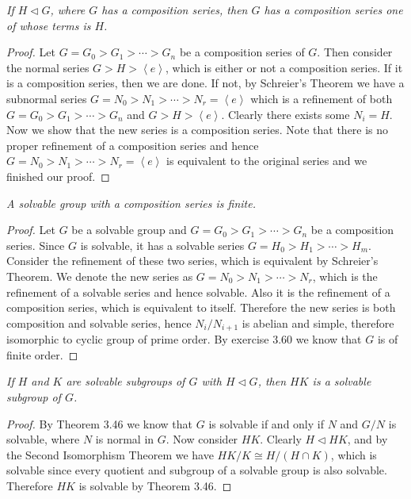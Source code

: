 \begin{problem}\em
If $H\lhd G$, where $G$ has a composition series, then $G$ has a composition series one of whose terms is $H$.
\end{problem}
\begin{proof}
Let $G=G_0>G_1>\cdots >G_n$ be a composition series of $G$. Then consider the normal series $G>H>\left< e \right> $, which is either or not a composition series. If it is a composition series, then we are done. If not, by Schreier's Theorem we have a subnormal series $G=N_0>N_1>\cdots >N_r=\left< e \right> $ which is a refinement of both $G=G_0>G_1>\cdots >G_n$ and $G>H>\left< e \right> $. Clearly there exists some $N_i=H$. Now we show that the new series is a composition series. Note that there is no proper refinement of a composition series and hence $G=N_0>N_1>\cdots >N_r=\left< e \right> $ is equivalent to the original series and we finished our proof.
\end{proof}
\begin{problem}\em
A solvable group with a composition series is finite.
\end{problem}
\begin{proof}
Let $G$ be a solvable group and $G=G_0>G_1>\cdots >G_n$ be a composition series. Since $G$ is solvable, it has a solvable series $G=H_0>H_1>\cdots >H_m$. Consider the refinement of these two series, which is equivalent by Schreier's Theorem. We denote the new series as $G=N_0>N_1>\cdots >N_r$, which is the refinement of a solvable series and hence solvable. Also it is the refinement of a composition series, which is equivalent to itself. Therefore the new series is both composition and solvable series, hence $N_i/N_{i+1}$ is abelian and simple, therefore isomorphic to cyclic group of prime order. By exercise 3.60 we know that $G$ is of finite order.
\end{proof}
\begin{problem}\em
If $H$ and $K$ are solvable subgroups of $G$ with $H\lhd G$, then $HK$ is a solvable subgroup of $G$.
\end{problem}
\begin{proof}
By Theorem 3.46 we know that $G$ is solvable if and only if $N$ and $G/N$ is solvable, where $N$ is normal in $G$. Now consider $HK$. Clearly $H\lhd HK$, and by the Second Isomorphism Theorem we have $HK/K\cong H/(H\cap K)$, which is solvable since every quotient and subgroup of a solvable group is also solvable. Therefore $HK$ is solvable by Theorem 3.46.
\end{proof}
